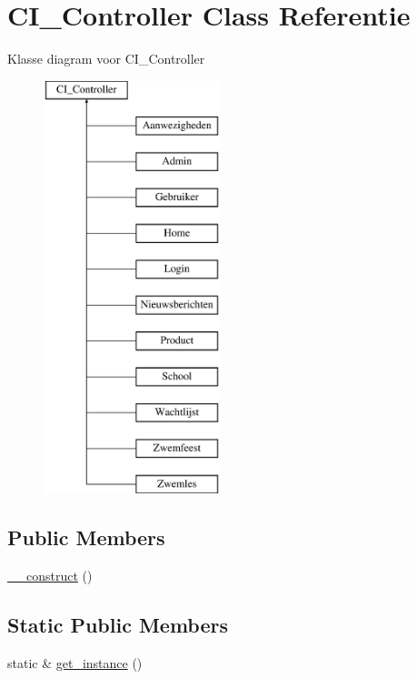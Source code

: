 \hypertarget{class_c_i___controller}{}\section{C\+I\+\_\+\+Controller Class Referentie}
\label{class_c_i___controller}
Klasse diagram voor C\+I\+\_\+\+Controller\begin{figure}[H]
\begin{center}
\leavevmode
\includegraphics[height=12.000000cm]{class_c_i___controller}
\end{center}
\end{figure}
\subsection*{Public Members}
\begin{DoxyCompactItemize}
\item 
\mbox{\hyperlink{class_c_i___controller_a095c5d389db211932136b53f25f39685}{\+\_\+\+\_\+construct}} ()
\end{DoxyCompactItemize}
\subsection*{Static Public Members}
\begin{DoxyCompactItemize}
\item 
static \& \mbox{\hyperlink{class_c_i___controller_a8d3cc57e7b6ec94e704712b0f277f5bb}{get\+\_\+instance}} ()
\end{DoxyCompactItemize}


